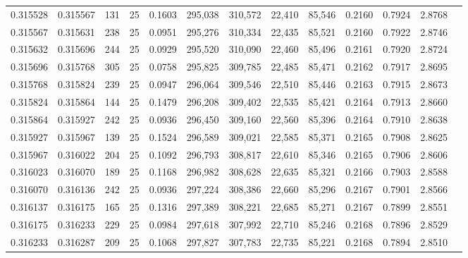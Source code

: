 \begin{tabular}{rrrrrrrrrrrrr}
0.315528 & 0.315567 &   131 &  25 &                                     0.1603 & 295,038 & 310,572 &  22,410 &  85,546 & 0.2160 & 0.7924 & 2.8768 \\
0.315567 & 0.315631 &   238 &  25 &                                     0.0951 & 295,276 & 310,334 &  22,435 &  85,521 & 0.2160 & 0.7922 & 2.8746 \\
0.315632 & 0.315696 &   244 &  25 &                                     0.0929 & 295,520 & 310,090 &  22,460 &  85,496 & 0.2161 & 0.7920 & 2.8724 \\
0.315696 & 0.315768 &   305 &  25 &                                     0.0758 & 295,825 & 309,785 &  22,485 &  85,471 & 0.2162 & 0.7917 & 2.8695 \\
0.315768 & 0.315824 &   239 &  25 &                                     0.0947 & 296,064 & 309,546 &  22,510 &  85,446 & 0.2163 & 0.7915 & 2.8673 \\
0.315824 & 0.315864 &   144 &  25 &                                     0.1479 & 296,208 & 309,402 &  22,535 &  85,421 & 0.2164 & 0.7913 & 2.8660 \\
0.315864 & 0.315927 &   242 &  25 &                                     0.0936 & 296,450 & 309,160 &  22,560 &  85,396 & 0.2164 & 0.7910 & 2.8638 \\
0.315927 & 0.315967 &   139 &  25 &                                     0.1524 & 296,589 & 309,021 &  22,585 &  85,371 & 0.2165 & 0.7908 & 2.8625 \\
0.315967 & 0.316022 &   204 &  25 &                                     0.1092 & 296,793 & 308,817 &  22,610 &  85,346 & 0.2165 & 0.7906 & 2.8606 \\
0.316023 & 0.316070 &   189 &  25 &                                     0.1168 & 296,982 & 308,628 &  22,635 &  85,321 & 0.2166 & 0.7903 & 2.8588 \\
0.316070 & 0.316136 &   242 &  25 &                                     0.0936 & 297,224 & 308,386 &  22,660 &  85,296 & 0.2167 & 0.7901 & 2.8566 \\
0.316137 & 0.316175 &   165 &  25 &                                     0.1316 & 297,389 & 308,221 &  22,685 &  85,271 & 0.2167 & 0.7899 & 2.8551 \\
0.316175 & 0.316233 &   229 &  25 &                                     0.0984 & 297,618 & 307,992 &  22,710 &  85,246 & 0.2168 & 0.7896 & 2.8529 \\
0.316233 & 0.316287 &   209 &  25 &                                     0.1068 & 297,827 & 307,783 &  22,735 &  85,221 & 0.2168 & 0.7894 & 2.8510 \\

\end{tabular}
